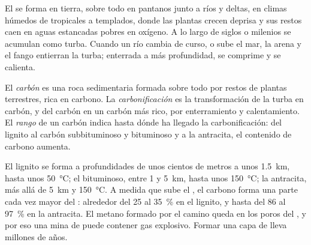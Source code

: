 El  se forma en tierra, sobre todo en pantanos junto a ríos y deltas,
en climas húmedos de tropicales a templados, donde las plantas crecen deprisa
y sus restos caen en aguas estancadas pobres en oxígeno. A lo largo de siglos
o milenios se acumulan como turba. Cuando un río cambia de curso, o sube el
mar, la arena y el fango entierran la turba; enterrada a más profundidad, se
comprime y se calienta.

\begin{definition}\label{def:g11:fossil-fuel-geology:coal}
El \emph{carbón} es una roca sedimentaria formada sobre todo por
restos de plantas terrestres, rica en carbono. La
\emph{carbonificación} es la transformación de la turba
en carbón, y del carbón en un carbón más rico, por enterramiento y
calentamiento. El \emph{rango} de un carbón indica
hasta dónde ha llegado la carbonificación: del lignito al carbón subbituminoso
y bituminoso y a la antracita, el contenido de carbono aumenta.
\end{definition}

El lignito se forma a profundidades de unos cientos de metros a unos
\qty{1.5}{km}, hasta unos \qty{50}{\degreeCelsius}; el  bituminoso,
entre 1 y \qty{5}{km}, hasta unos \qty{150}{\degreeCelsius}; la antracita,
más allá de \qty{5}{km} y \qty{150}{\degreeCelsius}. A medida que sube el
, el carbono forma una parte cada vez mayor del : alrededor del
25 al \qty{35}{\percent} en el lignito, y hasta del 86 al \qty{97}{\percent}
en la antracita. El metano formado por el camino queda en los poros del
, y por eso una mina de  puede contener gas explosivo. Formar una
capa de  lleva millones de años.

